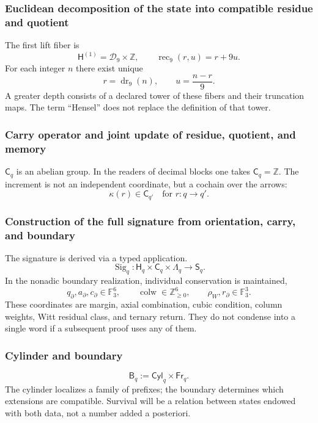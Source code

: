 {\subsubsection{Euclidean decomposition of the state into compatible residue and quotient}

The first lift fiber is
\[
 \mathsf H^{(1)}=\mathcal D_9\times\mathbb Z,
 \qquad
 \operatorname{rec}_9(r,u)=r+9u.
\]
For each integer \(n\) there exist unique
\[
 r=\operatorname{dr}_9(n),
 \qquad
 u=\frac{n-r}{9}.
\]
A greater depth consists of a declared tower of these fibers and their
truncation maps. The term ``Hensel'' does not replace the definition of
that tower.

\subsubsection{Carry operator and joint update of residue, quotient, and memory}

\(\mathsf C_q\) is an abelian group. In the readers of decimal blocks
one takes \(\mathsf C_q=\mathbb Z\). The increment is not an independent
coordinate, but a cochain over the arrows:
\[
 \kappa(r)\in\mathsf C_{q'}
 \quad\text{for }r:q\to q'.
\]

\subsubsection{Construction of the full signature from orientation, carry, and boundary}

The signature is derived via a typed application.
\[
 \operatorname{Sig}_q:
 \mathsf H_q\times\mathsf C_q\times\Lambda_q
 \longrightarrow\mathsf S_q.
\]
In the nonadic boundary realization, individual conservation is maintained,
\[
 q_\partial,a_\partial,c_\partial\in\mathbb F_3^6,
 \qquad
 \operatorname{colw}\in\mathbb Z_{\geq0}^{6},
 \qquad
 \rho_W,r_\partial\in\mathbb F_3^3.
\]
These coordinates are margin, axial combination, cubic condition, column
weights, Witt residual class, and ternary return. They do not condense into a
single word if a subsequent proof uses any of them.

\subsubsection{Cylinder and boundary}

\[
 \mathsf B_q:=\mathsf{Cyl}_q\times\mathsf{Fr}_q.
\]
The cylinder localizes a family of prefixes; the boundary determines which
extensions are compatible. Survival will be a relation between
states endowed with both data, not a number added a posteriori.

}
